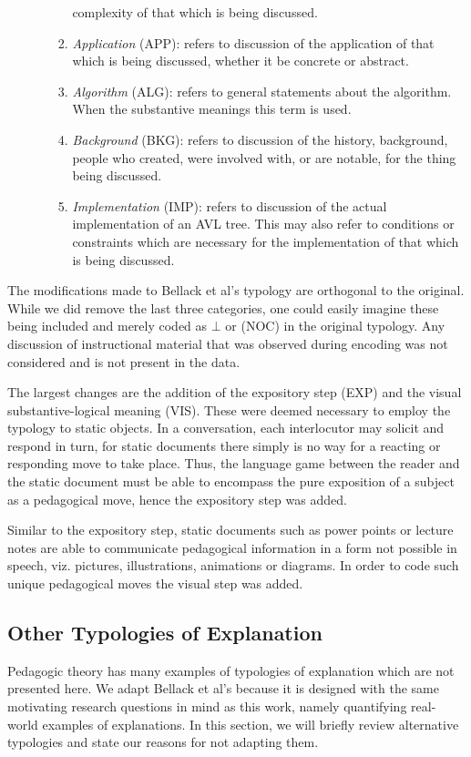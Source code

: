 \documentclass[conference]{IEEEtran}
\begin{document}
\begin{enumerate}[M1.]
\begin{enumerate}
\begin{enumerate}
            complexity of that which is being discussed. 
          \item \emph{Application} (APP): refers to discussion of the application of
            that which is being discussed, whether it be concrete or abstract.
          \item \emph{Algorithm} (ALG): refers to general statements about the
            algorithm. When the 
            substantive meanings this term is used.
          \item \emph{Background} (BKG): refers to discussion of the history,
            background, people who created, were involved with, or are notable,
            for the thing being discussed.
          \item \emph{Implementation} (IMP): refers to discussion of the actual
            implementation of an AVL tree. This may also refer to conditions or
            constraints which are necessary for the implementation of that which
            is being discussed.
       \end{enumerate}
    \end{enumerate}
\end{enumerate}

The modifications made to Bellack et al's typology are orthogonal to the
original. While we did remove the last three categories, one could easily
imagine these being included and merely coded as $\bot$ or (NOC) in the original
typology. Any discussion of instructional material that was observed during
encoding was not considered and is not present in the data.

The largest changes are the addition of the expository step (EXP) and the visual
substantive-logical meaning (VIS). These were deemed necessary to employ the
typology to static objects. In a conversation, each interlocutor may solicit and
respond in turn, for static documents there simply is no way for a reacting or
responding move to take place. Thus, the language game between the reader and
the static document must be able to encompass the pure exposition of a subject
as a pedagogical move, hence the expository step was added.

Similar to the expository step, static documents such as power points or lecture
notes are able to communicate pedagogical information in a form not possible in
speech, viz. pictures, illustrations, animations or diagrams. In order to code
such unique pedagogical moves the visual step was added.

\subsection{Other Typologies of Explanation}
Pedagogic theory has many examples of typologies of explanation which are not
presented here. We adapt Bellack et al's because it is designed with the same
motivating research questions in mind as this work, namely quantifying
real-world examples of explanations. In this section, we will briefly review
alternative typologies and state our reasons for not adapting them. 
\end{document}
